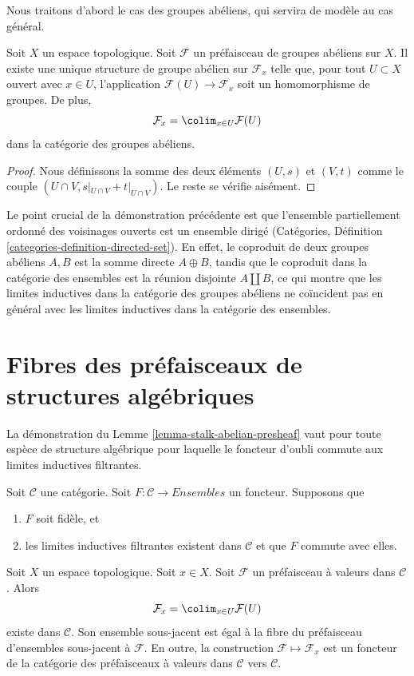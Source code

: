 \noindent
Nous traitons d'abord le cas des groupes abéliens, qui
servira de modèle au cas général.

\begin{lemma}
\label{lemma-stalk-abelian-presheaf}
Soit $X$ un espace topologique. Soit $\mathcal{F}$ un préfaisceau
de groupes abéliens sur $X$. Il existe une unique structure de
groupe abélien sur $\mathcal{F}_x$ telle que, pour tout
$U \subset X$ ouvert avec $x\in U$, l'application $\mathcal{F}(U) \to \mathcal{F}_x$
soit un homomorphisme de groupes. De plus,
$$
\mathcal{F}_x
=
\colim_{x\in U} \mathcal{F}(U)
$$
dans la catégorie des groupes abéliens.
\end{lemma}

\begin{proof}
Nous définissons la somme des deux éléments
$(U, s)$ et $(V, t)$ comme le couple $(U \cap V, s|_{U\cap V} +
t|_{U \cap V})$. Le reste se vérifie aisément.
\end{proof}

\noindent
Le point crucial de la démonstration précédente est que l'ensemble partiellement ordonné des
voisinages ouverts est un ensemble dirigé (Catégories, Définition
\ref{categories-definition-directed-set}). En effet, le coproduit
de deux groupes abéliens $A, B$ est la somme directe $A \oplus B$, tandis que
le coproduit dans la catégorie des ensembles est la réunion
disjointe $A \amalg B$, ce qui montre que les limites inductives dans la catégorie
des groupes abéliens ne coïncident pas en général avec les limites inductives dans la
catégorie des ensembles.


\section{Fibres des préfaisceaux de structures algébriques}
\label{section-stalks-presheaves-structures}

\noindent
La démonstration du Lemme \ref{lemma-stalk-abelian-presheaf} vaut
pour toute espèce de structure algébrique pour laquelle le foncteur
d'oubli commute aux limites inductives filtrantes.

\begin{lemma}
\label{lemma-stalk-presheaf-values-in-category}
Soit $\mathcal{C}$ une catégorie. Soit $F : \mathcal{C} \to \textit{Ensembles}$
un foncteur. Supposons que
\begin{enumerate}
\item $F$ soit fidèle, et
\item les limites inductives filtrantes existent dans $\mathcal{C}$ et que $F$ commute avec
elles.
\end{enumerate}
Soit $X$ un espace topologique. Soit $x \in X$. Soit $\mathcal{F}$
un préfaisceau à valeurs dans $\mathcal{C}$.
Alors
$$
\mathcal{F}_x = \colim_{x\in U} \mathcal{F}(U)
$$
existe dans $\mathcal{C}$. Son ensemble sous-jacent est égal à la
fibre du préfaisceau d'ensembles sous-jacent à $\mathcal{F}$.
En outre, la construction $\mathcal{F} \mapsto \mathcal{F}_x$
est un foncteur de la catégorie des préfaisceaux à valeurs dans
$\mathcal{C}$ vers $\mathcal{C}$.
\end{lemma}

